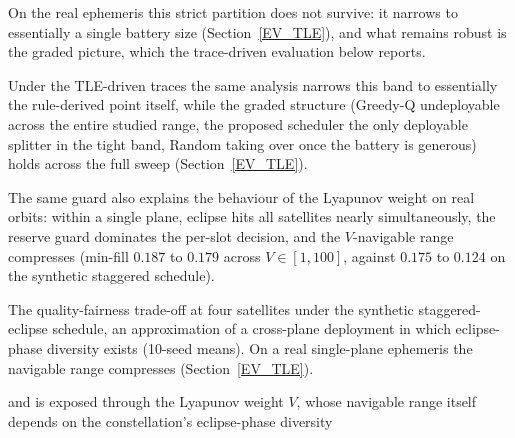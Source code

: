 
On the real ephemeris this strict partition does not survive: it narrows to
essentially a single battery size (Section~\ref{EV_TLE}), and what remains
robust is the graded picture, which the trace-driven evaluation below reports.

Under the TLE-driven traces the same analysis narrows this band to essentially
the rule-derived point itself, while the graded structure (Greedy-Q undeployable
across the entire studied range, the proposed scheduler the only deployable
splitter in the tight band, Random taking over once the battery is generous)
holds across the full sweep (Section~\ref{EV_TLE}).

The same guard also explains the behaviour of the Lyapunov weight on real
orbits: within a single plane, eclipse hits all satellites nearly
simultaneously, the reserve guard dominates the per-slot decision, and the
$V$-navigable range compresses (min-fill $0.187$ to $0.179$ across
$V\in[1,100]$, against $0.175$ to $0.124$ on the synthetic staggered schedule).

The quality-fairness trade-off at four satellites under the synthetic
staggered-eclipse schedule, an approximation of a cross-plane deployment in
which eclipse-phase diversity exists (10-seed means).
On a real single-plane ephemeris the navigable range compresses
(Section~\ref{EV_TLE}).

and is exposed through the Lyapunov weight $V$, whose navigable range itself
depends on the constellation's eclipse-phase diversity

